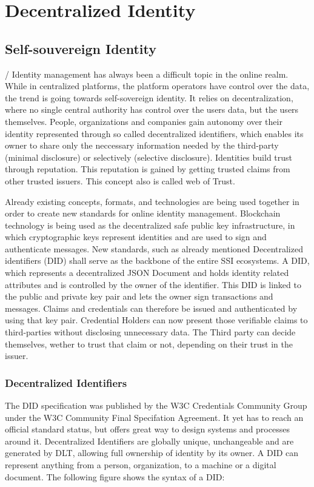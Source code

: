 \section{Decentralized Identity}

\subsection{Self-souvereign Identity}
/%
Identity management has always been a difficult topic in the online realm. While in centralized platforms, the platform operators have control over the data, the trend is going towards self-sovereign identity. It relies on decentralization, where no single central authority has control over the users data, but the users themselves. People, organizations and companies gain autonomy over their identity represented through so called decentralized identifiers, which enables its owner to share only the neccessary information needed by the third-party (minimal disclosure) or selectively (selective disclosure). Identities build trust through reputation. This reputation is gained by getting trusted claims from other trusted issuers. This concept also is called web of Trust. 

Already existing concepts, formats, and technologies are being used together in order to create new standards for online identity management. Blockchain technology is being used as the decentralized safe public key infrastructure, in which cryptographic keys represent identities and are used to sign and authenticate messages. New standards, such as already mentioned Decentralized identifiers (DID) shall serve as the backbone of the entire SSI ecosystems. A DID, which represents a decentralized JSON Document and holds identity related attributes and is controlled by the owner of the identifier. This DID is linked to the public and private key pair and lets the owner sign transactions and messages. Claims and credentials can therefore be issued and authenticated by using that key pair. 
Credential Holders can now present those verifiable claims to third-parties without disclosing unnecessary data. The Third party can decide themselves, wether to trust that claim or not, depending on their trust in the issuer. 

\subsubsection{Decentralized Identifiers}
The DID specification was published by the W3C Credentials Community Group under the W3C Community Final Specifation Agreement. 
It yet has to reach an official standard status, but offers great way to design systems and processes around it. 
Decentralized Identifiers are globally unique, unchangeable and are generated by DLT, allowing full ownership of identity by its owner. 
A DID can represent anything from a person, organization, to a machine or a digital document.  
The following figure shows the syntax of a DID: 

